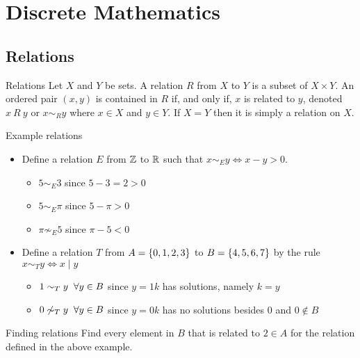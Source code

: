 \section{Discrete Mathematics}
\subsection{Relations}
\begin{definition}{Relations}{}
    Let $X$ and $Y$ be sets. A relation $R$ from $X$ to $Y$ is a subset of $X \times Y$. An ordered pair $(x, y)$ is contained in $R$ if, and only if, $x$ is related to $y$, denoted $x~R~ y$ or $x \sim_R y$ where $x \in X$ and $y \in Y$. If $X = Y$ then it is simply a relation on $X$.
\end{definition}

\begin{example}{Example relations}{}
    \begin{itemize}
        \item Define a relation $E$ from $\mathbb Z$ to $\mathbb R$ such that $x \sim_E y \Leftrightarrow x - y > 0$. 
        \begin{itemize}
            \item $5 \sim_E 3$ since $5-3 = 2 > 0$
            \item $5 \sim_E \pi$ since $5 - \pi > 0$
            \item $\pi \not\sim_E 5$ since $\pi - 5 < 0$
        \end{itemize}

        \item Define a relation $T$ from $A = \{0, 1, 2, 3\}$ to $B = \{4, 5, 6, 7\}$ by the rule $x \sim_T y \Leftrightarrow x \mid y$ 
        \begin{itemize}
            \item $1 \sim_T y \hspace{0.2cm} \forall y \in B$ since $y = 1k$ has solutions, namely $k=y$
            \item $0 \not\sim_T y \hspace{0.2cm} \forall y \in B$ since $y = 0k$ has no solutions besides $0$ and $0 \notin B$
        \end{itemize}
    \end{itemize}
\end{example}

\begin{question}{Finding relations}{}
    Find every element in $B$ that is related to $2 \in A$ for the relation defined in the above example.
\end{question}

